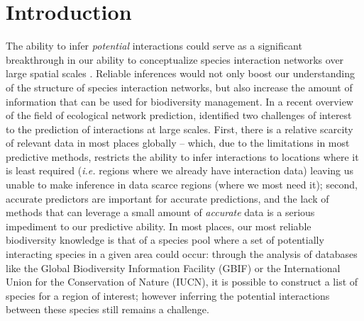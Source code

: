 \begin{abstract}{ecological networks, network embedding, transfer learning, netwrok macroecology} 1. Metawebs (networks of potential interactions within a species pool) are a powerful abstraction to understand how large-scale species interaction networks are structured.\\
2. Because metawebs are typically expressed at large spatial and taxonomic scales, assembling themis a tedious and costly process; predictive methods can help circumvent the limitations in datadeficiencies, by providing a first approximation of metawebs.\\
3. One way to improve our ability to predict metawebs is to maximize available information by using graph embeddings, as opposed to an exhaustive list of species interactions. Graph embedding is an emerging field in machine learning that holds great potential for ecological problems.\\
4. Here, we outline how the challenges associated with inferring metawebs line-up with the advantages of graph embeddings; followed by a discussion as to how the choice of the species pool has consequences on the reconstructed network, specifically as to the role of human-made (or arbitrarily assigned) boundaries and how these my influence ecological hypotheses.
\end{abstract}

\section{Introduction}

The ability to infer \emph{potential} interactions could serve as a
significant breakthrough in our ability to conceptualize species
interaction networks over large spatial scales \cite{Hortal2015Seven}.
Reliable inferences would not only boost our understanding of the
structure of species interaction networks, but also increase the amount
of information that can be used for biodiversity management. In a recent
overview of the field of ecological network prediction,
\cite{Strydom2021Roadmap} identified two challenges of interest to the
prediction of interactions at large scales. First, there is a relative
scarcity of relevant data in most places globally -- which, due to the
limitations in most predictive methods, restricts the ability to infer
interactions to locations where it is least required (\emph{i.e.}
regions where we already have interaction data) leaving us unable to
make inference in data scarce regions (where we most need it); second,
accurate predictors are important for accurate predictions, and the lack
of methods that can leverage a small amount of \emph{accurate} data is a
serious impediment to our predictive ability. In most places, our most
reliable biodiversity knowledge is that of a species pool where a set of
potentially interacting species in a given area could occur: through the
analysis of databases like the Global Biodiversity Information Facility
(GBIF) or the International Union for the Conservation of Nature (IUCN),
it is possible to construct a list of species for a region of interest;
however inferring the potential interactions between these species still
remains a challenge.


